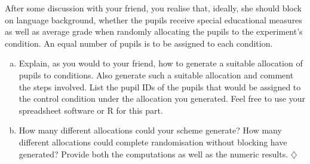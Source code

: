 \documentclass[a4paper]{tufte-book}\usepackage[]{graphicx}\usepackage[]{xcolor}
\newcommand*{\parend}[1][$\diamondsuit$]{%
  \unskip\nobreak\hspace{1em plus 1fill}$\diamondsuit$%
}
\begin{document}
After some discussion with your friend, you realise that, ideally,
she should block on language background, whether the pupils receive special educational
measures as well as average grade when randomly allocating the pupils to
the experiment's condition. An equal number of pupils is to be assigned
to each condition.

  \begin{enumerate}[(a)]
    \item Explain, as you would to your friend, how to generate
          a suitable allocation of pupils to conditions.
          Also generate such a suitable allocation and comment
          the steps involved.
          List the pupil IDs of the pupils that would be assigned to the control
          condition under the allocation you generated.
          Feel free to use your spreadsheet software or R for this part.
    \item How many different allocations could your scheme generate?
          How many different allocations could complete randomisation without
          blocking have generated?
          Provide both the computations as well as the numeric results. \parend
  \end{enumerate}
\end{document}
